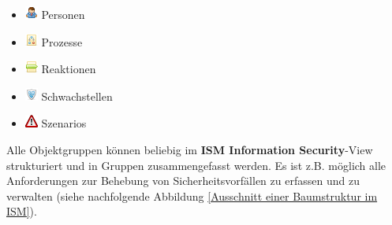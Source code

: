 \documentclass[a4paper,10pt]{book}
\begin{document}
\begin{itemize}
\item \includegraphics[height=2ex]{Icon/Mitarbeiter.png} Personen
\item \includegraphics[height=2ex]{Icon/Prozesse.png} Prozesse
\item \includegraphics[height=2ex]{Icon/Reaktionen.png} Reaktionen
\item \includegraphics[height=2ex]{Icon/Schwachstellen.png} Schwachstellen
\item \includegraphics[height=2ex]{Icon/Szenarios.png} Szenarios
\end{itemize}
Alle Objektgruppen können beliebig im \textbf{ISM Information Security}-View strukturiert und in Gruppen zusammengefasst werden.
Es ist z.B. möglich alle Anforderungen zur Behebung von Sicherheitsvorfällen zu erfassen und zu verwalten (siehe nachfolgende Abbildung \ref{Ausschnitt einer Baumstruktur im ISM}).
\newline
\end{document}
